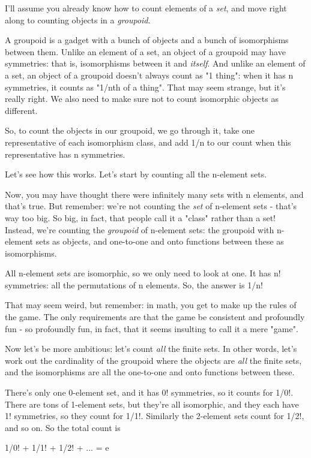I'll assume you already know how to count elements of a \emph{set},
and move right along to counting objects in a \emph{groupoid}.

A groupoid is a gadget with a bunch of objects and a bunch of
isomorphisms between them.  Unlike an element of a set, an object of a
groupoid may have symmetries: that is, isomorphisms between it and
\emph{itself}.  And unlike an element of a set, an object of a
groupoid doesn't always count as "1 thing": when it has n symmetries,
it counts as "1/nth of a thing".  That may seem strange, but it's
really right.  We also need to make sure not to count isomorphic
objects as different.

So, to count the objects in our groupoid, we go through it, take one
representative of each isomorphism class, and add 1/n to our count
when this representative has n symmetries.

Let's see how this works.  Let's start by counting all the n-element sets.

Now, you may have thought there were infinitely many sets with n
elements, and that's true. But remember: we're not counting the
\emph{set} of n-element sets - that's way too big.  So big, in fact,
that people call it a "class" rather than a set!  Instead, we're
counting the \emph{groupoid} of n-element sets: the groupoid with
n-element sets as objects, and one-to-one and onto functions between
these as isomorphisms.

All n-element sets are isomorphic, so we only need to look at one.  It
has n! symmetries: all the permutations of n elements.  So, the answer
is 1/n!

That may seem weird, but remember: in math, you get to make up the
rules of the game.  The only requirements are that the game be
consistent and profoundly fun - so profoundly fun, in fact, that it
seems insulting to call it a mere "game".

Now let's be more ambitious: let's count \emph{all} the finite sets.
In other words, let's work out the cardinality of the groupoid where
the objects are \emph{all} the finite sets, and the isomorphisms are
all the one-to-one and onto functions between these.

There's only one 0-element set, and it has 0! symmetries, so it counts
for 1/0!.  There are tons of 1-element sets, but they're all
isomorphic, and they each have 1! symmetries, so they count for 1/1!.
Similarly the 2-element sets count for 1/2!, and so on.  So the total
count is

1/0! + 1/1! + 1/2! + ... = e

